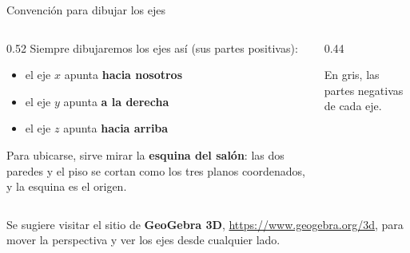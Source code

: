 \documentclass[aspectratio=169,10pt]{beamer}
\newcommand{\destaca}[1]{%
  \par\vspace{3pt}\noindent
  \colorbox{turquesaClaro}{%
    \parbox{\dimexpr\linewidth-2\fboxsep\relax}{\vspace{3pt}#1\vspace{3pt}}}%
  \par\vspace{3pt}}
\begin{document}
\begin{frame}{Convención para dibujar los ejes}
  \begin{columns}[T]
    \begin{column}{0.52\textwidth}
      Siempre dibujaremos los ejes así (sus partes positivas):

      \vspace{0.2cm}
      \begin{itemize}
        \item el eje $x$ apunta \textbf{hacia nosotros}
        \item el eje $y$ apunta \textbf{a la derecha}
        \item el eje $z$ apunta \textbf{hacia arriba}
      \end{itemize}
      
      \vspace{0.3cm}
      \destaca{\small Para ubicarse, sirve mirar la \textbf{esquina
      del salón}: las dos paredes y el piso se cortan como los tres
      planos coordenados, y la esquina es el origen.}
    \end{column}
    \begin{column}{0.44\textwidth}
      \begin{center}
      \end{center}
      
     \vspace{-0.4cm}
      {\footnotesize En gris, las partes negativas de cada eje.}
    \end{column}
  \end{columns}
  
  \vspace{0.4cm}
  {\footnotesize Se sugiere visitar el sitio de \textbf{GeoGebra 3D},
  \url{https://www.geogebra.org/3d}, para mover la perspectiva y ver
  los ejes desde cualquier lado.}
\end{frame}
\end{document}
